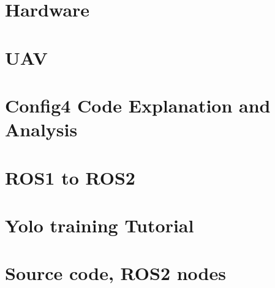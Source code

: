 \documentclass[
oneside    %
]{USN-BSc}
\begin{document}
\cleardoublepage

\printbibliography[heading=bibintoc, title={References}]


\appendix


%

\chapter{Hardware}
\label{ch:hardware}


\chapter{UAV}
\label{ch:UAV}


\chapter{Config4 Code Explanation and Analysis}
\label{ch:algo}


\chapter{ROS1 to ROS2}
\label{ch:ros1toros2}


%

\chapter{Yolo training Tutorial}
\label{appendix:Yolo Training Tutorial}


\chapter{Source code, ROS2 nodes}
\label{appendix:NodeCode}

\end{document}
